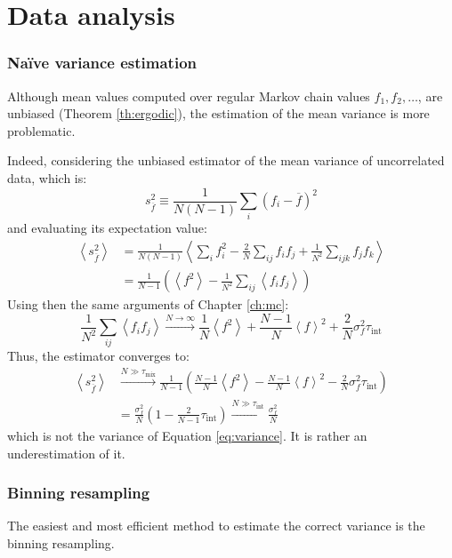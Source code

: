\chapter{Data analysis}\label{ap:data}

\subsection*{Na\"ive variance estimation}
Although mean values computed over regular Markov chain values $f_1,f_2,\ldots$, are unbiased (Theorem \eqref{th:ergodic}),
the estimation of the mean variance is more problematic.

Indeed, considering the unbiased estimator of the mean variance of uncorrelated data, which is:
\[
    s_{\overline f}^2 \equiv \frac{1}{N(N-1)}\sum_i\left(f_i-\overline f\right)^2
\]
and evaluating its expectation value:
\[\begin{aligned}
    \left<s_{\overline f}^2\right> &= \frac{1}{N(N-1)}\left<\sum_if_i^2-\frac{2}{N}\sum_{ij}f_if_j+\frac{1}{N^2}\sum_{ijk}f_jf_k\right> \\
                                   &= \frac{1}{N-1}\left(\left<f^2\right>-\frac{1}{N^2}\sum_{ij}\left<f_if_j\right>\right)
\end{aligned}\]
Using then the same arguments of Chapter \ref{ch:mc}:
\[
    \frac{1}{N^2}\sum_{ij}\left<f_if_j\right> \xrightarrow{N\to\infty}\frac{1}{N}\left<f^2\right> + \frac{N-1}{N}\left<f\right>^2+\frac{2}{N}\sigma_f^2\tau_\mathrm{int}
\]
Thus, the estimator converges to: 
\[\begin{aligned}
    \left<s_{\overline f}^2\right> &\xrightarrow{N\gg\tau_\mathrm{mix}}
                                     \frac{1}{N-1}\left(\frac{N-1}{N}\left<f^2\right>-\frac{N-1}{N}\left<f\right>^2-\frac{2}{N}\sigma_f^2\tau_\mathrm{int}\right) \\
                                   &= \frac{\sigma_f^2}{N}\left(1-\frac{2}{N-1}\tau_\mathrm{int}\right) \xrightarrow{N\gg\tau_\mathrm{int}} \frac{\sigma_f^2}{N}
\end{aligned}\]
which is not the variance of Equation \eqref{eq:variance}.
It is rather an underestimation of it.

\subsection*{Binning resampling}
The easiest and most efficient method to estimate the correct variance is the binning resampling.

